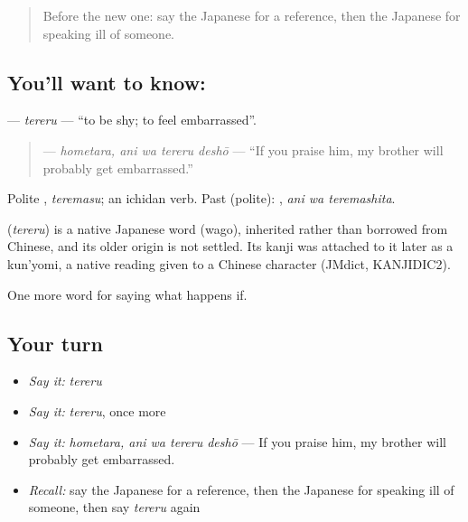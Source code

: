 \label{lesson:JA-C371-tereru}



\begin{quote}
Before the new one: say the Japanese for a reference, then the Japanese for speaking ill of someone.
\end{quote}

\subsection*{You'll want to know: }
\textbf{} — \emph{tereru} — \textquotedblleft{}to be shy; to feel embarrassed\textquotedblright{}.

\begin{quote}
\textbf{ } — \emph{hometara, ani wa tereru deshō} — \textquotedblleft{}If you praise him, my brother will probably get embarrassed.\textquotedblright{}
\end{quote}

Polite \textbf{}, \emph{teremasu}; an ichidan verb. Past (polite): \textbf{ }, \emph{ani wa teremashita}.

\begin{cousinweb}
\textbf{} (\emph{tereru}) is a native Japanese word (wago), inherited rather than borrowed from Chinese, and its older origin is not settled. Its kanji was attached to it later as a kun'yomi, a native reading given to a Chinese character (JMdict, KANJIDIC2).
\end{cousinweb}

\begin{grammarlens}[title={What you've built}]
One more word for saying what happens if.
\end{grammarlens}

\subsection*{Your turn}
\begin{itemize}
\raggedright
  \item \emph{Say it:} \emph{tereru}
  \item \emph{Say it:} \emph{tereru}, once more
  \item \emph{Say it:} \emph{hometara, ani wa tereru deshō} — If you praise him, my brother will probably get embarrassed.
  \item \emph{Recall:} say the Japanese for a reference, then the Japanese for speaking ill of someone, then say \emph{tereru} again
\end{itemize}

